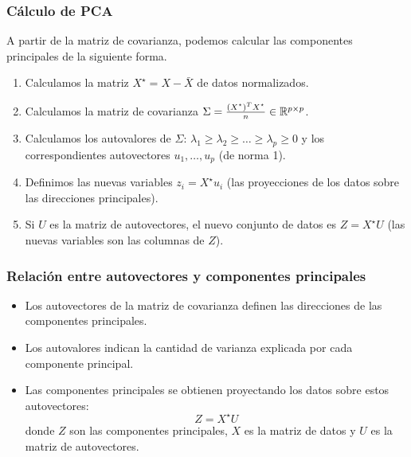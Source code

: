 \documentclass[aspectratio=169,12pt]{beamer}
\begin{document}
\begin{frame}
    \frametitle{Cálculo de PCA}

A partir de la matriz de covarianza, podemos calcular las componentes principales de la siguiente forma.

    \begin{enumerate}
        \item Calculamos la matriz $X^\star = X - \bar X$ de datos normalizados.
        \item Calculamos la matriz de covarianza $\Sigma = \frac{(X^\star)^T X^\star}{n} \in {\mathbb R}^{p \times p}$.
        \item Calculamos los autovalores de $\Sigma$: $\lambda_1 \ge \lambda_2 \ge  \dots \ge \lambda_p \ge 0$ y los correspondientes autovectores $u_1, \dots, u_p$ (de norma 1).

        \item Definimos las nuevas variables $z_i = X^\star u_i$ (las proyecciones de los datos sobre las direcciones principales).
        \item Si $U$ es la matriz de autovectores, el nuevo conjunto de datos es $Z = X^\star U$ (las nuevas variables son las columnas de $Z$).
    \end{enumerate}
\end{frame}

\begin{frame}
    \frametitle{Relación entre autovectores y componentes principales}
    \begin{itemize}
        \item Los autovectores de la matriz de covarianza definen las direcciones de las componentes principales.
        \item Los autovalores indican la cantidad de varianza explicada por cada componente principal.
        \item Las componentes principales se obtienen proyectando los datos sobre estos autovectores:
    \[
    Z = X^\star U
    \]
    donde $Z$ son las componentes principales, \( {X} \) es la matriz de datos y \( {U} \) es la matriz de autovectores.
    \end{itemize}
    
\end{frame}
\end{document}
